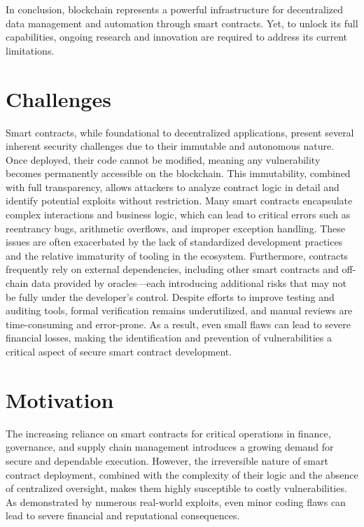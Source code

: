 In conclusion, blockchain represents a powerful infrastructure for decentralized data management and automation through smart contracts. Yet, to unlock its full capabilities, ongoing research and innovation are required to address its current limitations.

\chapter{Challenges}
Smart contracts, while foundational to decentralized applications, present several inherent security challenges due to their immutable and autonomous nature. Once deployed, their code cannot be modified, meaning any vulnerability becomes permanently accessible on the blockchain. This immutability, combined with full transparency, allows attackers to analyze contract logic in detail and identify potential exploits without restriction. Many smart contracts encapsulate complex interactions and business logic, which can lead to critical errors such as reentrancy bugs, arithmetic overflows, and improper exception handling. These issues are often exacerbated by the lack of standardized development practices and the relative immaturity of tooling in the ecosystem. Furthermore, contracts frequently rely on external dependencies, including other smart contracts and off-chain data provided by oracles—each introducing additional risks that may not be fully under the developer's control. Despite efforts to improve testing and auditing tools, formal verification remains underutilized, and manual reviews are time-consuming and error-prone. As a result, even small flaws can lead to severe financial losses, making the identification and prevention of vulnerabilities a critical aspect of secure smart contract development.

\chapter{Motivation}
The increasing reliance on smart contracts for critical operations in finance, governance, and supply chain management introduces a growing demand for secure and dependable execution. However, the irreversible nature of smart contract deployment, combined with the complexity of their logic and the absence of centralized oversight, makes them highly susceptible to costly vulnerabilities. As demonstrated by numerous real-world exploits, even minor coding flaws can lead to severe financial and reputational consequences.

